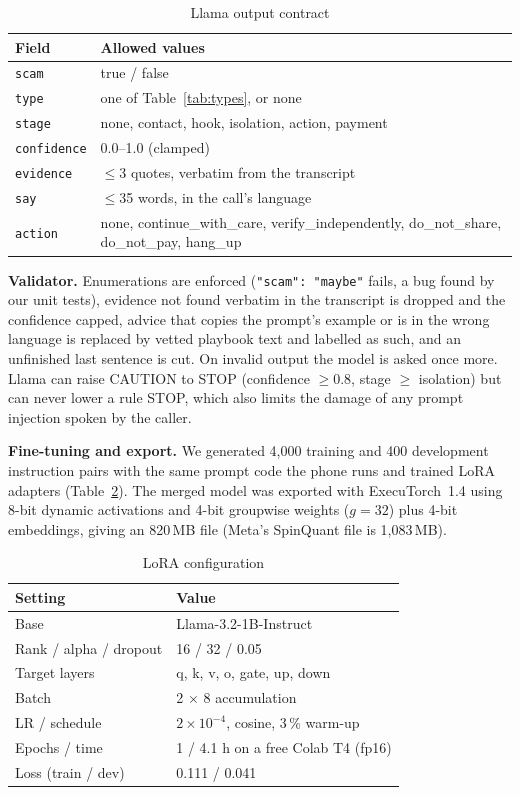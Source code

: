 \documentclass[conference]{IEEEtran}
\begin{document}
\begin{table}[t]
\caption{Llama output contract}
\label{tab:json}
\centering
\footnotesize
\setlength{\tabcolsep}{3pt}
\begin{tabular}{@{}lp{}@{}}
\toprule
Field & Allowed values \\
\midrule
\texttt{scam} & true / false \\
\texttt{type} & one of Table~\ref{tab:types}, or none \\
\texttt{stage} & none, contact, hook, isolation, action, payment \\
\texttt{confidence} & 0.0--1.0 (clamped) \\
\texttt{evidence} & $\leq$3 quotes, verbatim from the transcript \\
\texttt{say} & $\leq$35 words, in the call's language \\
\texttt{action} & none, continue\_with\_care, verify\_independently, do\_not\_share, do\_not\_pay, hang\_up \\
\bottomrule
\end{tabular}
\end{table}

\textbf{Validator.} Enumerations are enforced (\texttt{"scam": "maybe"} fails, a bug found by our unit tests), evidence not found verbatim in the transcript is dropped and the confidence capped, advice that copies the prompt's example or is in the wrong language is replaced by vetted playbook text and labelled as such, and an unfinished last sentence is cut. On invalid output the model is asked once more. Llama can raise CAUTION to STOP (confidence $\geq 0.8$, stage $\geq$ isolation) but can never lower a rule STOP, which also limits the damage of any prompt injection spoken by the caller.

\textbf{Fine-tuning and export.} We generated 4,000 training and 400 development instruction pairs with the same prompt code the phone runs and trained LoRA~\cite{lora} adapters (Table~\ref{tab:lora}). The merged model was exported with ExecuTorch~1.4 using 8-bit dynamic activations and 4-bit groupwise weights ($g{=}32$) plus 4-bit embeddings, giving an 820\,MB file (Meta's SpinQuant file is 1,083\,MB).

\begin{table}[t]
\caption{LoRA configuration}
\label{tab:lora}
\centering
\footnotesize
\setlength{\tabcolsep}{3pt}
\begin{tabular}{@{}ll@{}}
\toprule
Setting & Value \\
\midrule
Base & Llama-3.2-1B-Instruct \\
Rank / alpha / dropout & 16 / 32 / 0.05 \\
Target layers & q, k, v, o, gate, up, down \\
Batch & 2 $\times$ 8 accumulation \\
LR / schedule & $2\times10^{-4}$, cosine, 3\,\% warm-up \\
Epochs / time & 1 / 4.1 h on a free Colab T4 (fp16) \\
Loss (train / dev) & 0.111 / 0.041 \\
\bottomrule
\end{tabular}
\end{table}
\end{document}
